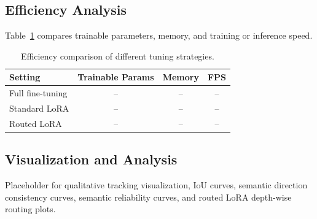 \subsection{Efficiency Analysis}
Table~\ref{tab:efficiency} compares trainable parameters, memory, and training or inference speed.

\begin{table}[t]
\centering
\caption{Efficiency comparison of different tuning strategies.}
\label{tab:efficiency}
\begin{tabular}{lccc}
\toprule
Setting & Trainable Params & Memory & FPS \\
\midrule
Full fine-tuning & -- & -- & -- \\
Standard LoRA & -- & -- & -- \\
Routed LoRA & -- & -- & -- \\
\bottomrule
\end{tabular}
\end{table}

\subsection{Visualization and Analysis}
Placeholder for qualitative tracking visualization, IoU curves, semantic direction consistency curves, semantic reliability curves, and routed LoRA depth-wise routing plots.
